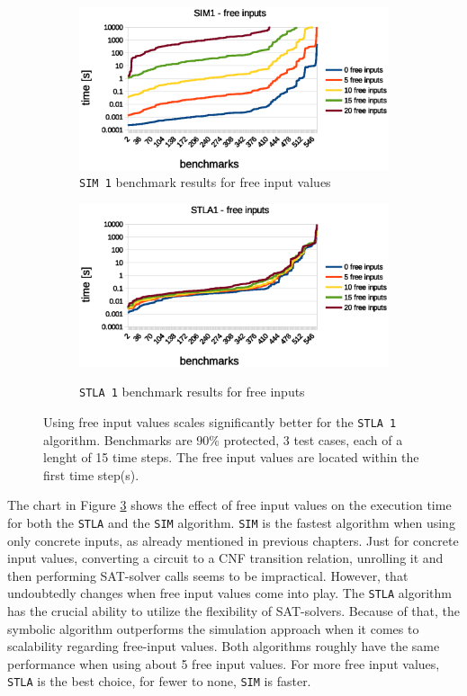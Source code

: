 \documentclass[a4paper,10pt]{article}
\begin{document}
\begin{figure}[!hbt]
\centering
  \begin{subfigure}[b]{0.95\linewidth}  \centering
    \includegraphics[width=\linewidth]{img/sim_free_inputs.eps}
    \caption{\texttt{SIM 1} benchmark results for free input values}
    \label{free_inputs_sim}
  \end{subfigure}
  \begin{subfigure}[b]{0.95\linewidth}  \centering
    \includegraphics[width=\linewidth]{img/stla1_free_inputs.eps}
    \label{free_inputs_stla}
    \caption{\texttt{STLA 1}  benchmark results for free inputs}
  \end{subfigure}
  \caption{Using free input values scales significantly better for the \texttt{STLA 1} algorithm. Benchmarks are 90\% protected, 3 test cases, each of a lenght of 15 time steps. The free input values are located within the first time step(s). }
\label{fig_free_inputs}
\end{figure}

The chart in Figure \ref{fig_free_inputs} shows the effect of free input values on the execution time for both the \texttt{STLA} and the \texttt{SIM} algorithm.
\texttt{SIM} is the fastest algorithm when using only concrete inputs, as already mentioned in previous chapters. Just for concrete input values, converting a circuit to a CNF transition relation, unrolling it and then
performing SAT-solver calls seems to be impractical. However, that undoubtedly changes when free input values come into play. The \texttt{STLA} algorithm has the crucial ability to utilize the flexibility of SAT-solvers.
Because of that, the symbolic algorithm outperforms the simulation approach when it comes to scalability regarding free-input values. Both algorithms roughly have the same performance when using about 5 free input values.
For more free input values, \texttt{STLA} is the best choice, for fewer to none, \texttt{SIM} is faster.
\end{document}
